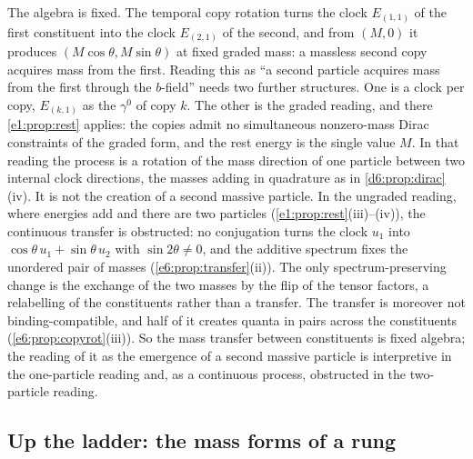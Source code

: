 \begin{remark}
\label{e6:rem:transfer}
The algebra is fixed. The temporal copy rotation turns the clock $E_{(1,1)}$ of the first constituent into the clock $E_{(2,1)}$ of the second, and
from $(M,0)$ it produces $(M\cos\theta,M\sin\theta)$ at fixed graded mass: a massless second copy acquires mass from the first. Reading this as ``a
second particle acquires mass from the first through the $b$-field'' needs two further structures. One is a clock per copy, $E_{(k,1)}$ as the
$\gamma^0$ of copy $k$. The other is the graded reading, and there \cref{e1:prop:rest} applies: the copies admit no simultaneous nonzero-mass Dirac constraints of the graded form, and the rest energy is
the single value $M$. In that reading the process is a rotation of the mass direction of one particle between two internal clock directions,
the masses adding in quadrature as in \cref{d6:prop:dirac}(iv). It is not the creation of a second massive particle. In the ungraded
reading, where energies add and there are two particles (\cref{e1:prop:rest}(iii)--(iv)), the continuous transfer is obstructed: no conjugation turns
the clock $u_1$ into $\cos\theta\,u_1+\sin\theta\,u_2$ with $\sin2\theta\neq0$, and the additive spectrum fixes the unordered pair of masses
(\cref{e6:prop:transfer}(ii)). The only spectrum-preserving change is the exchange of the two masses by the flip of the tensor factors, a
relabelling of the constituents rather than a transfer. The transfer is moreover not
binding-compatible, and half of it creates quanta in pairs across the constituents (\cref{e6:prop:copyrot}(iii)). So the mass transfer between
constituents is fixed algebra; the reading of it as the emergence of a second massive particle is interpretive in the one-particle reading and,
as a continuous process, obstructed in the two-particle reading.
\end{remark}

\subsection{Up the ladder: the mass forms of a rung}
\label{e6:sec:ladder}

